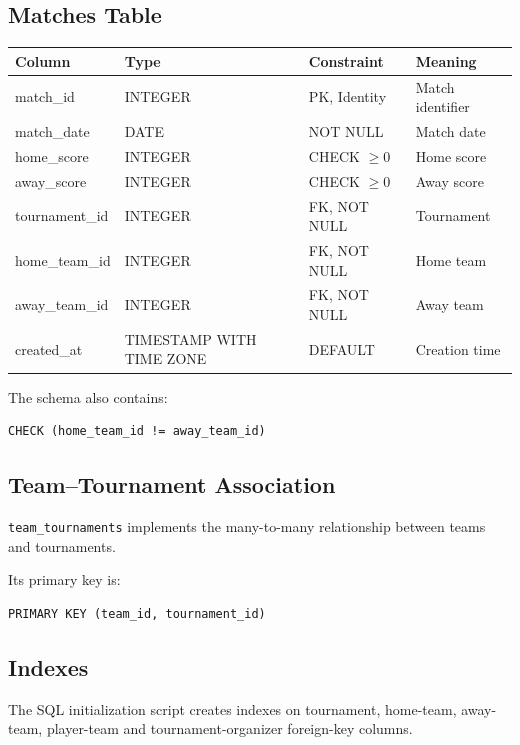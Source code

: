 \documentclass[11pt,a4paper]{article}
\begin{document}
\subsection{Matches Table}

\begin{longtable}{llll}
\toprule
\textbf{Column} & \textbf{Type} & \textbf{Constraint} & \textbf{Meaning}\\
\midrule
match\_id & INTEGER & PK, Identity & Match identifier\\
match\_date & DATE & NOT NULL & Match date\\
home\_score & INTEGER & CHECK $\geq 0$ & Home score\\
away\_score & INTEGER & CHECK $\geq 0$ & Away score\\
tournament\_id & INTEGER & FK, NOT NULL & Tournament\\
home\_team\_id & INTEGER & FK, NOT NULL & Home team\\
away\_team\_id & INTEGER & FK, NOT NULL & Away team\\
created\_at & TIMESTAMP WITH TIME ZONE & DEFAULT & Creation time\\
\bottomrule
\end{longtable}

The schema also contains:

\begin{lstlisting}
CHECK (home_team_id != away_team_id)
\end{lstlisting}

\subsection{Team--Tournament Association}

\texttt{team\_tournaments} implements the many-to-many relationship
between teams and tournaments.

Its primary key is:

\begin{lstlisting}
PRIMARY KEY (team_id, tournament_id)
\end{lstlisting}

\subsection{Indexes}

The SQL initialization script creates indexes on tournament, home-team,
away-team, player-team and tournament-organizer foreign-key columns.

\end{document}
